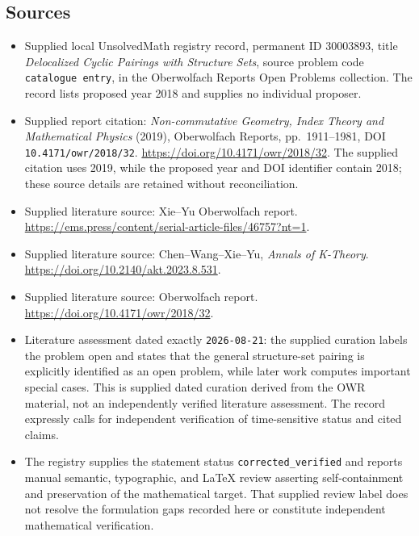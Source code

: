 \documentclass[11pt]{article}
\begin{document}
\subsection{Sources}
\begin{itemize}
\item Supplied local UnsolvedMath registry record, permanent ID \(30003893\), title \emph{Delocalized Cyclic Pairings with Structure Sets}, source problem code \texttt{catalogue entry}, in the Oberwolfach Reports Open Problems collection. The record lists proposed year 2018 and supplies no individual proposer.
\item Supplied report citation: \emph{Non-commutative Geometry, Index Theory and Mathematical Physics} (2019), Oberwolfach Reports, pp.\ 1911--1981, DOI \texttt{10.4171/owr/2018/32}. \url{https://doi.org/10.4171/owr/2018/32}. The supplied citation uses 2019, while the proposed year and DOI identifier contain 2018; these source details are retained without reconciliation.
\item Supplied literature source: Xie--Yu Oberwolfach report. \url{https://ems.press/content/serial-article-files/46757?nt=1}.
\item Supplied literature source: Chen--Wang--Xie--Yu, \emph{Annals of K-Theory}. \url{https://doi.org/10.2140/akt.2023.8.531}.
\item Supplied literature source: Oberwolfach report. \url{https://doi.org/10.4171/owr/2018/32}.
\item Literature assessment dated exactly \texttt{2026-08-21}: the supplied curation labels the problem open and states that the general structure-set pairing is explicitly identified as an open problem, while later work computes important special cases. This is supplied dated curation derived from the OWR material, not an independently verified literature assessment. The record expressly calls for independent verification of time-sensitive status and cited claims.
\item The registry supplies the statement status \texttt{corrected\_verified} and reports manual semantic, typographic, and LaTeX review asserting self-containment and preservation of the mathematical target. That supplied review label does not resolve the formulation gaps recorded here or constitute independent mathematical verification.
\end{itemize}
\end{document}
